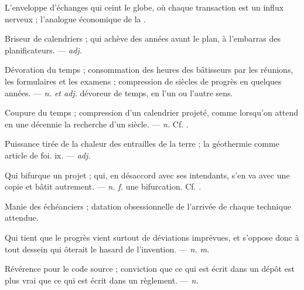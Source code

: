  L'enveloppe d'échanges qui ceint le globe, où chaque transaction est un influx nerveux ; l'analogue économique de la .

 Briseur de calendriers ; qui achève des années avant le plan, à l'embarras des planificateurs. ---  \textit{adj.}

 Dévoration du temps ;   consommation des heures des bâtisseurs par les réunions, les formulaires et les examens ;   compression de siècles de progrès en quelques années. ---  \textit{n. et adj.} dévoreur de temps, en l'un ou l'autre sens.

 Coupure du temps ; compression d'un calendrier projeté, comme lorsqu'on attend en une décennie la recherche d'un siècle. ---  \textit{n.} Cf. .

 Puissance tirée de la chaleur des entrailles de la terre ; la géothermie comme article de foi.   ix. ---  \textit{adj.}

 Qui bifurque un projet ; qui, en désaccord avec ses intendants, s'en va avec une copie et bâtit autrement.  ---  \textit{n. f.} une bifurcation. Cf. .

 Manie des échéanciers ; datation obsessionnelle de l'arrivée de chaque technique attendue.

 Qui tient que le progrès vient surtout de déviations imprévues, et s'oppose donc à tout dessein qui ôterait le hasard de l'invention. ---  \textit{n. m.}

 Révérence pour le code source ; conviction que ce qui est écrit dans un dépôt est plus vrai que ce qui est écrit dans un règlement. ---  \textit{n.}

